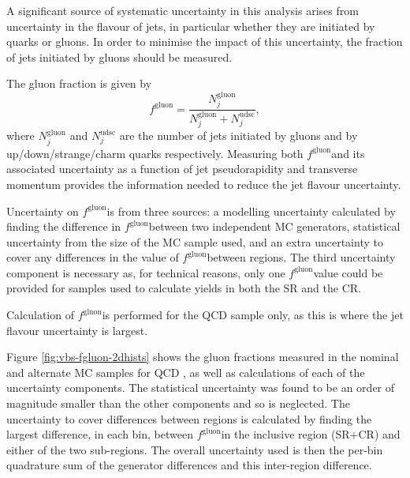 \newcommand\fgluon{$f^\text{gluon}$}

A significant source of systematic uncertainty in this analysis arises from
uncertainty in the flavour of jets, in particular whether they are initiated by
quarks or gluons. In order to minimise the impact of this uncertainty, the
fraction of jets initiated by gluons should be measured.

The gluon fraction is given by
%
\begin{equation*}
  f^\text{gluon} = \frac{ N_j^\text{gluon} }
                        { N_j^\text{gluon} + N_j^\text{udsc}},
\end{equation*}
%
where $N_j^\mathrm{gluon}$ and $N_j^\mathrm{udsc}$ are the number of
jets initiated by gluons and by up/down/strange/charm quarks respectively.
Measuring both \fgluon and its associated uncertainty as a function of jet
pseudorapidity and transverse momentum provides the information needed to reduce
the jet flavour uncertainty.

Uncertainty on \fgluon is from three sources: a modelling uncertainty calculated
by finding the difference in \fgluon between two independent \ac{MC} generators,
statistical uncertainty from the size of the \ac{MC} sample used, and an extra
uncertainty to cover any differences in the value of \fgluon between regions.
The third uncertainty component is necessary as, for technical reasons, only one
\fgluon value could be provided for samples used to calculate yields in both
the \ac{SR} and the \ac{CR}.

Calculation of \fgluon is performed for the \ac{QCD} \Zy sample only, as this is
where the jet flavour uncertainty is largest.

Figure \ref{fig:vbs-fgluon-2dhists} shows the gluon fractions measured in the
nominal and alternate \ac{MC} samples for \ac{QCD} \Zy, as well as calculations
of each of the uncertainty components.  The statistical uncertainty was found to
be an order of magnitude smaller than the other components and so is neglected.
The uncertainty to cover differences between regions is calculated by finding
the largest difference, in each bin, between \fgluon in the inclusive region
(\ac{SR}+\ac{CR}) and either of the two sub-regions. The overall uncertainty
used is then the per-bin quadrature sum of the generator differences and this
inter-region difference.


